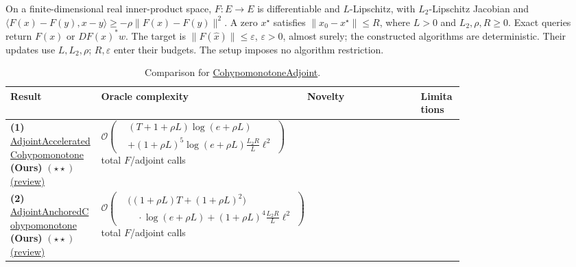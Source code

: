 \begin{table}[tp]
\centering
\caption{Comparison for \href{https://github.com/k3nfalt/longtails/blob/main/LongTails/Setups/CohypomonotoneAdjoint.lean}{CohypomonotoneAdjoint}.}\label{tab:CohypomonotoneAdjoint}
\parbox{\linewidth}{\footnotesize On a finite-dimensional real inner-product space, $F:E\to E$ is differentiable and $L$-Lipschitz, with $L_2$-Lipschitz Jacobian and $\langle F(x)-F(y),x-y\rangle\ge-\rho\|F(x)-F(y)\|^2$. A zero $x^\star$ satisfies $\|x_0-x^\star\|\le R$, where $L>0$ and $L_2,\rho,R\ge0$. Exact queries return $F(x)$ or $DF(x)^*w$. The target is $\|F(\widehat x)\|\le\varepsilon$, $\varepsilon>0$, almost surely; the constructed algorithms are deterministic. Their updates use $L,L_2,\rho$; $R,\varepsilon$ enter their budgets. The setup imposes no algorithm restriction.}\par\smallskip
\begin{threeparttable}
\footnotesize
\setlength{\tabcolsep}{4pt}\renewcommand{\arraystretch}{1.25}
\begin{tabularx}{\linewidth}{@{}>{\raggedright\arraybackslash}p{0.20\linewidth}>{\raggedright\arraybackslash}p{0.32\linewidth}>{\raggedright\arraybackslash}p{0.25\linewidth}>{\raggedright\arraybackslash}X@{}}
\toprule
\textbf{Result} & \textbf{Oracle complexity} & \textbf{Novelty} & \textbf{Limitations} \\
\midrule
\textbf{(1)} \href{https://github.com/k3nfalt/longtails/blob/main/LongTails/Theorems/AdjointAcceleratedCohypomonotone.lean}{Adjoint\allowbreak Accelerated\allowbreak Cohypomonotone} \textbf{(Ours)} $(\star\star)$ \href{https://github.com/k3nfalt/longtails/blob/main/scripts/reviews/AdjointAcceleratedCohypomonotone.md}{(review)}
& $\mathcal{O}\!\left(\begin{aligned}&(T+1+\rho L)\log(e+\rho L)\\&+(1+\rho L)^5\log(e+\rho L)\frac{L_2R}{L}\ell^2\end{aligned}\right)$ total $F$/adjoint calls
& & \\
\midrule
\textbf{(2)} \href{https://github.com/k3nfalt/longtails/blob/main/LongTails/Theorems/AdjointAnchoredCohypomonotone.lean}{Adjoint\allowbreak Anchored\allowbreak Cohypomonotone} \textbf{(Ours)} $(\star\star)$ \href{https://github.com/k3nfalt/longtails/blob/main/scripts/reviews/AdjointAnchoredCohypomonotone.md}{(review)}
& $\mathcal{O}\!\left(\begin{aligned}&\bigl((1+\rho L)T+(1+\rho L)^2\bigr)\\&\quad\cdot\log(e+\rho L)+(1+\rho L)^4\frac{L_2R}{L}\ell^2\end{aligned}\right)$ total $F$/adjoint calls

\end{tabularx}
\end{threeparttable}
\end{table}
